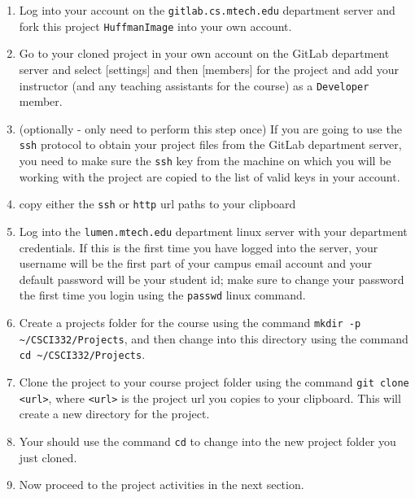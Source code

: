\documentclass[10pt]{article}
\begin{document}
\begin{enumerate}
   \item Log into your account on the \verb|gitlab.cs.mtech.edu| department server and fork this project \verb|HuffmanImage| into your own account.
   
   \item Go to your cloned project in your own account on the GitLab department server and select [settings] and then [members] for the project and add your instructor (and any teaching assistants for the course) as a \verb|Developer| member. 
   
   \item (optionally - only need to perform this step once) If you are going to use the \verb|ssh| protocol to obtain your project files from the GitLab department server, you need to make sure the \verb|ssh| key from the machine on which you will be working with the project are copied to the list of valid keys in your account.
   
   \item copy either the \verb|ssh| or \verb|http| url paths to your clipboard
   
   \item Log into the \verb|lumen.mtech.edu| department linux server with your department credentials. If this is the first time you have logged into the server, your username will be the first part of your campus email account and your default password will be your student id; make sure to change your password the first time you login using the \verb|passwd| linux command.
   
   \item Create a projects folder for the course using the command \verb|mkdir -p ~/CSCI332/Projects|, and then change into this directory using the command \verb|cd ~/CSCI332/Projects|.
   
   \item Clone the project to your course project folder using the command \verb|git clone <url>|, where \verb|<url>| is the project url you copies to your clipboard. This will create a new directory for the project. 
   
   \item Your should use the command \verb|cd| to change into the new project folder you just cloned.
   
   \item Now proceed to the project activities in the next section.
\end{enumerate}
\end{document}
